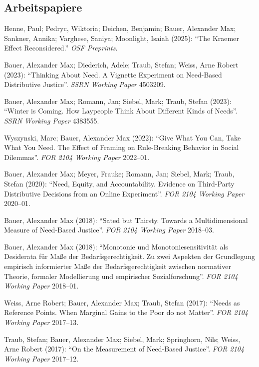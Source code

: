 \documentclass[a4paper,10pt]{article}
\newenvironment{literature}{%
   \parskip6pt\parindent0pt\raggedright
   \def\lititem{\hangindent=1cm\hangafter1}}{%
   \par\ignorespaces}
\begin{document}
\subsection*{Arbeitspapiere}
\begin{literature}
\lititem Henne, Paul; Pedryc, Wiktoria; Deichen, Benjamin; Bauer, Alexander Max; Sankner, Annika; Varghese, Saniya; Moonlight, Isaiah (2025): \enquote{The Kraemer Effect Reconsidered.} \textit{OSF Preprints}.

\lititem Bauer, Alexander Max; Diederich, Adele; Traub, Stefan; Weiss, Arne Robert (2023): \enquote{Thinking About Need. A Vignette Experiment on Need-Based Distributive Justice}. \textit{SSRN Working Paper} 4503209.

\lititem Bauer, Alexander Max; Romann, Jan; Siebel, Mark; Traub, Stefan (2023): \enquote{Winter is Coming. How Laypeople Think About Different Kinds of Needs}. \textit{SSRN Working Paper} 4383555.

\lititem Wyszynski, Marc; Bauer, Alexander Max (2022): \enquote{Give What You Can, Take What You Need. The Effect of Framing on Rule-Breaking Behavior in Social Dilemmas}. \textit{FOR 2104 Working Paper} 2022--01.

\lititem Bauer, Alexander Max; Meyer, Frauke; Romann, Jan; Siebel, Mark; Traub, Stefan (2020): \enquote{Need, Equity, and Accountability. Evidence on Third-Party Distributive Decisions from an Online Experiment}. \textit{FOR 2104 Working Paper} 2020--01.

\lititem Bauer, Alexander Max (2018): \enquote{Sated but Thirsty. Towards a Multidimensional Measure of Need-Based Justice}. \textit{FOR 2104 Working Paper} 2018--03.

\lititem Bauer, Alexander Max (2018): \enquote{Monotonie und Monotoniesensitivität als Desiderata für Maße der Bedarfsgerechtigkeit. Zu zwei Aspekten der Grundlegung empirisch informierter Maße der Bedarfsgerechtigkeit zwischen normativer Theorie, formaler Modellierung und empirischer Sozialforschung}. \textit{FOR 2104 Working Paper} 2018--01.

\lititem Weiss, Arne Robert; Bauer, Alexander Max; Traub, Stefan (2017): \enquote{Needs as Reference Points. When Marginal Gains to the Poor do not Matter}. \textit{FOR 2104 Working Paper} 2017--13.

\lititem Traub, Stefan; Bauer, Alexander Max; Siebel, Mark; Springhorn, Nils; Weiss, Arne Robert (2017): \enquote{On the Measurement of Need-Based Justice}. \textit{FOR 2104 Working Paper} 2017--12.
\end{literature}
\end{document}
